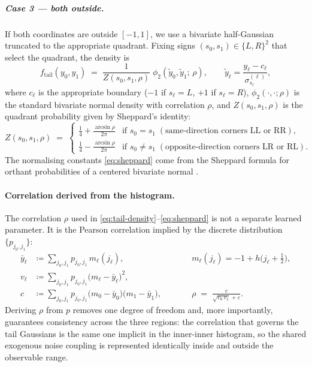 \subparagraph{Case 3 --- both outside.} If both coordinates are outside
$[-1,1]$, we use a bivariate half-Gaussian truncated to the appropriate
quadrant. Fixing signs $(s_0, s_1) \in \{L, R\}^{2}$ that select the
quadrant, the density is
\begin{equation}
f_{\mathrm{tail}}(y_0, y_1)
\;=\;
\frac{1}{Z(s_0, s_1,\rho)}\;
\phi_{2}\!\left(\tilde{y}_0, \tilde{y}_1;\, \rho\right),
\qquad
\tilde{y}_\ell = \frac{y_\ell - c_\ell}{\sigma_{s_\ell}^{(\ell)}},
\label{eq:tail-density}
\end{equation}
where $c_\ell$ is the appropriate boundary ($-1$ if $s_\ell = L$, $+1$
if $s_\ell = R$), $\phi_{2}(\cdot, \cdot; \rho)$ is the standard
bivariate normal density with correlation $\rho$, and
$Z(s_0, s_1, \rho)$ is the quadrant probability given by Sheppard's
identity:
\begin{equation}
Z(s_0, s_1, \rho)
\;=\;
\begin{cases}
\tfrac{1}{4} + \tfrac{\arcsin\rho}{2\pi}
  & \text{if } s_0 = s_1 \; (\text{same-direction corners LL or RR}), \\[4pt]
\tfrac{1}{4} - \tfrac{\arcsin\rho}{2\pi}
  & \text{if } s_0 \ne s_1 \; (\text{opposite-direction corners LR or RL}).
\end{cases}
\label{eq:sheppard}
\end{equation}
The normalising constants \eqref{eq:sheppard} come from the Sheppard
formula for orthant probabilities of a centered bivariate normal
\citep{sheppard1899application}.

\paragraph{Correlation derived from the histogram.}
The correlation $\rho$ used in \eqref{eq:tail-density}--\eqref{eq:sheppard}
is not a separate learned parameter. It is the Pearson correlation
implied by the discrete distribution $\{p_{j_0, j_1}\}$:
\begin{equation}
\begin{aligned}
\bar{y}_\ell &\coloneqq \sum_{j_0, j_1} p_{j_0, j_1}\, m_\ell(j_\ell),\qquad
&& m_\ell(j_\ell) = -1 + h\bigl(j_\ell + \tfrac{1}{2}\bigr), \\[2pt]
v_\ell &\coloneqq \sum_{j_0, j_1} p_{j_0, j_1}\bigl(m_\ell - \bar{y}_\ell\bigr)^{2}, \\[2pt]
c &\coloneqq \sum_{j_0, j_1} p_{j_0, j_1}\bigl(m_0 - \bar{y}_0\bigr)\!\bigl(m_1 - \bar{y}_1\bigr),\qquad
&& \rho \;=\; \frac{c}{\sqrt{v_0\, v_1} + \varepsilon}.
\end{aligned}
\label{eq:rho-derived}
\end{equation}
Deriving $\rho$ from $p$ removes one degree of freedom and, more
importantly, guarantees consistency across the three regions: the
correlation that governs the tail Gaussians is the same one implicit in
the inner-inner histogram, so the shared exogenous noise coupling is
represented identically inside and outside the observable range.

